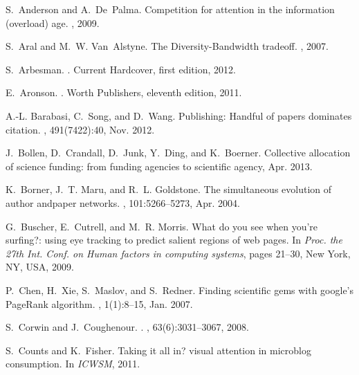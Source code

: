\documentclass[10pt]{bmc_article}
\begin{document}
%
%

\begin{thebibliography}{10}

S.~Anderson and A.~De~Palma.
\newblock Competition for attention in the information (overload) age.
, 2009.

S.~Aral and M.~W. Van~Alstyne.
\newblock The {Diversity-Bandwidth} tradeoff.
, 2007.

S.~Arbesman.
.
\newblock Current Hardcover, first edition, 2012.

E.~Aronson.
.
\newblock Worth Publishers, eleventh edition, 2011.

A.-L. Barabasi, C.~Song, and D.~Wang.
\newblock Publishing: Handful of papers dominates citation.
, 491(7422):40, Nov. 2012.

J.~Bollen, D.~Crandall, D.~Junk, Y.~Ding, and K.~Boerner.
\newblock Collective allocation of science funding: from funding agencies to
  scientific agency, Apr. 2013.

K.~Borner, J.~T. Maru, and R.~L. Goldstone.
\newblock The simultaneous evolution of author andpaper networks.
, 101:5266--5273, Apr. 2004.

G.~Buscher, E.~Cutrell, and M.~R. Morris.
\newblock What do you see when you're surfing?: using eye tracking to predict
  salient regions of web pages.
\newblock In {\em Proc. the 27th Int. Conf. on Human factors in computing
  systems}, pages 21--30, New York, NY, USA, 2009.

P.~Chen, H.~Xie, S.~Maslov, and S.~Redner.
\newblock Finding scientific gems with google's {PageRank} algorithm.
, 1(1):8--15, Jan. 2007.

S.~Corwin and J.~Coughenour.
.
, 63(6):3031--3067, 2008.

S.~Counts and K.~Fisher.
\newblock Taking it all in? visual attention in microblog consumption.
\newblock In {\em ICWSM}, 2011.


\end{thebibliography}
\end{document}
